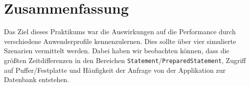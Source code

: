 \chapter{Zusammenfassung}
Das Ziel dieses Praktikums war die Auswirkungen auf die Performance durch verschiedene Anwenderprofile kennenzulernen. Dies sollte über vier simulierte Szenarien vermittelt werden.
Dabei haben wir beobachten können, dass die größten Zeitdifferenzen in den Bereichen \texttt{Statement}/\texttt{PreparedStatement}, Zugriff auf Puffer/Festplatte und Häufigkeit der Anfrage von der Applikation zur Datenbank entstehen.